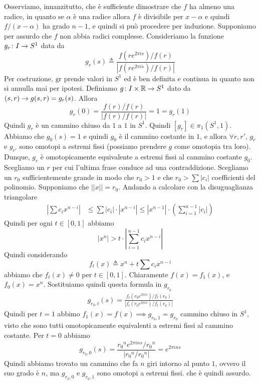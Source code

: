 \documentclass[a4paper]{article}
\begin{document}
\begin{snippetproof}{}
    Osserviamo, innanzitutto, che è sufficiente dimostrare che
    \(f\) ha almeno una radice, in quanto se \(\alpha\) è una radice allora
    \(f\) è divisibile per \(x-\alpha\) e quindi \(f/(x-\alpha)\) ha grado \(n-1\),
    e quindi si può procedere per induzione.
    Supponiamo per assurdo che \(f\) non abbia radici complesse.
    Consideriamo la funzione \(g_r \colon I \to S^1\)
    data da
    \[
        g_r(s) \triangleq \frac{
            f(re^{2\pi i s}) / f(r)
        }{
            |f(re^{2\pi i s}) / f(r)|
        }
    \]
    Per costruzione, \(\text{gr}\) prende valori in \(S^1\) ed è ben definita e continua
    in quanto non si annulla mai per ipotesi.
    Definiamo \(g \colon I \times \mathbb{R} \to S^1\)
    dato da \((s,r) \to g(s,r) = g_r(s)\).
    Allora \[
        g_r(0) = \frac{f(r) / f(r)}{|f(r)/f(r)|} = 1 = g_r(1)
    \]
    Quindi \(g_r\) è un cammino chiuso da \(1\) a \(1\) in \(S^1\).
    Quindi \([g_r] \in \pi_1(S^1, 1)\).
    Abbiamo che \(g_0(s) = 1\) e quindi \(g_0\) è il cammino costante
    in \(1\), e allora \(\forall r, r'\), \(g_r\) e \(g_{r'}\)
    sono omotopi a estremi fissi
    (possiamo prendere \(g\) come omotopia tra loro).
    Dunque, \(g_r\) è omotopicamente equivalente a estremi fissi al cammino costante \(g_0\).
    Scegliamo un \(r\) per cui
    l'ultima frase conduce ad una contraddizione.
    Scegliamo un \(r_0\) sufficientemente grande
    in modo che \(r_0 > 1\) e che \(r_0 > \sum |c_i|\)
    coefficienti del polinomio.
    Supponiamo che \(||x|| = r_0\).
    Andando a calcolare con la disuguaglianza triangolare
    \begin{align*}
        \left|\sum c_i x^{n-i}\right|
        & \leq \sum |c_i| \cdot |x^{n-i}| \leq
        |x^{n-1}| \cdot \left(\sum_{i=1}^{n-1}|c_i|\right)
    \end{align*}
    Quindi per ogni \(t\in [0,1]\) abbiamo
    \[
        |x^n| > t \cdot \left|\sum_{i=1}^{n-1} c_i x^{n-i}\right|
    \]
    Quindi considerando
    \[
        f_t(x) \triangleq x^n + t\sum c_i x^{n-i}
    \]
    abbiamo che \(f_t(x) \neq 0\) per \(t \in [0,1]\).
    Chiaramente \(f(x) = f_1(x)\), e \(f_0(x) = x^n\).
    Sostituiamo quindi questa formula in \(g_{r_0}\)
    \begin{align*}
        g_{r_0,t}(s) = \frac{
            f_t(r_0 e^{2\pi i s}) / f_t(r_0)
        }{
            |f_t(r_0 e^{2\pi i s}) / f_t(r_0)|
        }
    \end{align*}
    Quindi per \(t=1\) abbimo \(f_1(x) = f(x) \implies g_{r_0, 1} = g_{r_0}\)
    cammino chiuso in \(S^1\), visto che sono tutti omotopicamente equivalenti a estremi fissi
    al cammino costante.
    Per \(t=0\) abbiamo
    \[
        g_{r_0, 0}(s) = \frac{
            {r_0}^n e^{2\pi i n s} / {r_0}^n
        }{
            |{r_0}^n / {r_0}^n|
        } = e^{2\pi i n s}
    \]
    Quindi abbiamo trovato un cammino che fa \(n\) giri intorno al punto \(1\),
    ovvero il suo grado è \(n\), ma \(g_{r_0, 0}\) e \(g_{r_0, 1}\) sono omotopi a estremi fissi.
    che è quindi assurdo.
\end{snippetproof}
\end{document}
